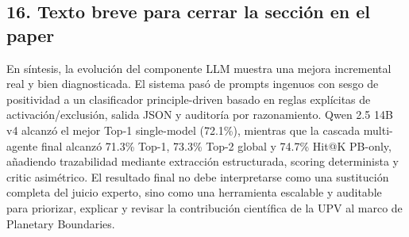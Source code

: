 \subsection{16. Texto breve para cerrar la sección en el paper}

En síntesis, la evolución del componente LLM muestra una mejora incremental real y bien diagnosticada. El sistema pasó de prompts ingenuos con sesgo de positividad a un clasificador principle-driven basado en reglas explícitas de activación/exclusión, salida JSON y auditoría por razonamiento. Qwen 2.5 14B v4 alcanzó el mejor Top-1 single-model (72.1\%), mientras que la cascada multi-agente final alcanzó 71.3\% Top-1, 73.3\% Top-2 global y 74.7\% Hit@K PB-only, añadiendo trazabilidad mediante extracción estructurada, scoring determinista y critic asimétrico. El resultado final no debe interpretarse como una sustitución completa del juicio experto, sino como una herramienta escalable y auditable para priorizar, explicar y revisar la contribución científica de la UPV al marco de Planetary Boundaries.
